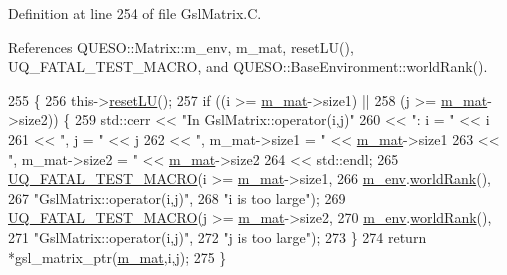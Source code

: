 Definition at line 254 of file Gsl\-Matrix.\-C.



References Q\-U\-E\-S\-O\-::\-Matrix\-::m\-\_\-env, m\-\_\-mat, reset\-L\-U(), U\-Q\-\_\-\-F\-A\-T\-A\-L\-\_\-\-T\-E\-S\-T\-\_\-\-M\-A\-C\-R\-O, and Q\-U\-E\-S\-O\-::\-Base\-Environment\-::world\-Rank().


\begin{DoxyCode}
255 \{
256   this->\hyperlink{class_q_u_e_s_o_1_1_gsl_matrix_ab55ec308530e4135a719181a6351840c}{resetLU}();
257   \textcolor{keywordflow}{if} ((i >= \hyperlink{class_q_u_e_s_o_1_1_gsl_matrix_a2cac0bd065e280a06445f944d5f3e3b3}{m\_mat}->size1) ||
258       (j >= \hyperlink{class_q_u_e_s_o_1_1_gsl_matrix_a2cac0bd065e280a06445f944d5f3e3b3}{m\_mat}->size2)) \{
259     std::cerr << \textcolor{stringliteral}{"In GslMatrix::operator(i,j)"}
260               << \textcolor{stringliteral}{": i = "} << i
261               << \textcolor{stringliteral}{", j = "} << j
262               << \textcolor{stringliteral}{", m\_mat->size1 = "} << \hyperlink{class_q_u_e_s_o_1_1_gsl_matrix_a2cac0bd065e280a06445f944d5f3e3b3}{m\_mat}->size1
263               << \textcolor{stringliteral}{", m\_mat->size2 = "} << \hyperlink{class_q_u_e_s_o_1_1_gsl_matrix_a2cac0bd065e280a06445f944d5f3e3b3}{m\_mat}->size2
264               << std::endl;
265     \hyperlink{_defines_8h_a56d63d18d0a6d45757de47fcc06f574d}{UQ\_FATAL\_TEST\_MACRO}(i >= \hyperlink{class_q_u_e_s_o_1_1_gsl_matrix_a2cac0bd065e280a06445f944d5f3e3b3}{m\_mat}->size1,
266                         \hyperlink{class_q_u_e_s_o_1_1_matrix_a247fb0fc0b87fecdee054bb4660b68e8}{m\_env}.\hyperlink{class_q_u_e_s_o_1_1_base_environment_a78b57112bbd0e6dd0e8afec00b40ffa7}{worldRank}(),
267                         \textcolor{stringliteral}{"GslMatrix::operator(i,j)"},
268                         \textcolor{stringliteral}{"i is too large"});
269     \hyperlink{_defines_8h_a56d63d18d0a6d45757de47fcc06f574d}{UQ\_FATAL\_TEST\_MACRO}(j >= \hyperlink{class_q_u_e_s_o_1_1_gsl_matrix_a2cac0bd065e280a06445f944d5f3e3b3}{m\_mat}->size2,
270                         \hyperlink{class_q_u_e_s_o_1_1_matrix_a247fb0fc0b87fecdee054bb4660b68e8}{m\_env}.\hyperlink{class_q_u_e_s_o_1_1_base_environment_a78b57112bbd0e6dd0e8afec00b40ffa7}{worldRank}(),
271                         \textcolor{stringliteral}{"GslMatrix::operator(i,j)"},
272                         \textcolor{stringliteral}{"j is too large"});
273   \}
274   \textcolor{keywordflow}{return} *gsl\_matrix\_ptr(\hyperlink{class_q_u_e_s_o_1_1_gsl_matrix_a2cac0bd065e280a06445f944d5f3e3b3}{m\_mat},i,j);
275 \}
\end{DoxyCode}
